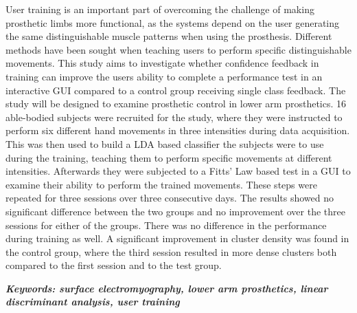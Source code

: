 

User training is an important part of overcoming the challenge of making prosthetic limbs more functional, as the systems depend on the user generating the same distinguishable muscle patterns when using the prosthesis. Different methods have been sought when teaching users to perform specific distinguishable movements. This study aims to investigate whether confidence feedback in training can improve the users ability to complete a performance test in an interactive GUI compared to a control group receiving single class feedback. The study will be designed to examine prosthetic control in lower arm prosthetics.
16 able-bodied subjects were recruited for the study, where they were instructed to perform six different hand movements in three intensities during data acquisition. This was then used to build a LDA based classifier the subjects were to use during the training, teaching them to perform specific movements at different intensities. Afterwards they were subjected to a Fitts' Law based test in a GUI to examine their ability to perform the trained movements. These steps were repeated for three sessions over three consecutive days.
The results showed no significant difference between the two groups and no improvement over the three sessions for either of the groups. There was no difference in the performance during training as well. A significant improvement in cluster density was found in the control group, where the third session resulted in more dense clusters both compared to the first session and to the test group.

\textit{\textbf{Keywords: surface electromyography, lower arm prosthetics, linear discriminant analysis, user training}}